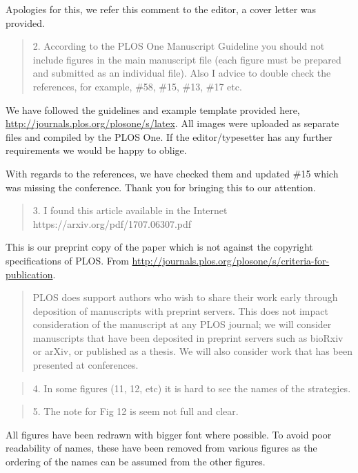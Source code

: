 \documentclass[a4]{article}
\begin{document}
Apologies for this, we refer this comment to the editor, a cover letter was
provided.

\begin{quote}
    2. According to the PLOS One Manuscript Guideline you should not include
    figures in the main manuscript file (each figure must be prepared and
    submitted as an individual file). Also I advice to double check the
    references, for example, \#58, \#15, \#13, \#17 etc.
\end{quote}

We have followed the guidelines and example template provided here,
\url{http://journals.plos.org/plosone/s/latex}. All images were uploaded as
separate files and compiled by the PLOS One. If the editor/typesetter has any
further requirements we would be happy to oblige.

With regards to the references, we have checked them and updated \#15 which was
missing the conference. Thank you for bringing this to our attention.

\begin{quote}
    3. I found this article available in the Internet
    https://arxiv.org/pdf/1707.06307.pdf
\end{quote}

This is our preprint copy of the paper which is not against the copyright
specifications of PLOS. From
\url{http://journals.plos.org/plosone/s/criteria-for-publication}.

\begin{quote}
    PLOS does support authors who wish to share their
    work early through deposition of manuscripts with preprint servers. This
    does not impact consideration of the manuscript at any PLOS journal; we will
    consider manuscripts that have been deposited in preprint servers such as
    bioRxiv or arXiv, or published as a thesis. We will also consider work that
    has been presented at conferences.
\end{quote}

\begin{quote}
    4. In some figures (11, 12, etc) it is hard to see the names of the
    strategies.
\end{quote}

\begin{quote}
    5. The note for Fig 12 is seem not full and clear.
\end{quote}

All figures have been redrawn with bigger font where possible. To avoid poor
readability of names, these have been removed from various figures as the
ordering of the names can be assumed from the other figures.
\end{document}
